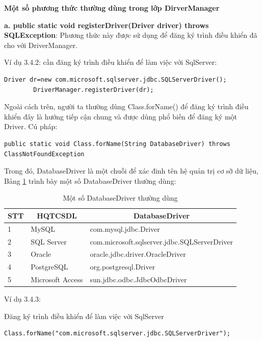 \textbf{Một số phương thức thường dùng trong lớp DirverManager}


 \textbf{a. public static void registerDriver(Driver driver) throws SQLException}: 
	Phương thức này được sử dụng để đăng ký trình điều khiển đã cho với DriverManager.
	
	Ví dụ 3.4.2: cần đăng ký trình điều khiển để làm việc với SqlServer:
		\lstset{language=Java}
	\begin{lstlisting}[escapechar=`]
		Driver dr=new com.microsoft.sqlserver.jdbc.SQLServerDriver();
		DriverManager.registerDriver(dr);
	\end{lstlisting}
	
Ngoài cách trên, người ta thường dùng Class.forName()  để đăng ký trình điều khiển đây là hướng tiếp cận chung và được dùng phổ biến để đăng ký một Driver. Cú pháp:
	\lstset{language=Java}

\begin{lstlisting}[escapechar=`]
public static void Class.forName(String DatabaseDriver) throws ClassNotFoundException
\end{lstlisting}
Trong đó, DatabaseDriver là một chuỗi để xác đinh tên hệ quản trị cơ sỡ dữ liệu, Bảng \ref{bang32} trình bày một số DatabaseDriver thường dùng:
\begin{center}
	\begin{longtable}{|m{1cm}|m{2cm}|m{8cm}|}
		\caption[Một số DatabaseDriver thường dùng]{Một số DatabaseDriver thường dùng}
		\label{bang32}
		\endfirsthead
		\endhead
		\hline
		\multicolumn{1}{|c|}{\textbf{STT}} &\multicolumn{1}{c|}{	\textbf{ HQTCSDL}}
		&\multicolumn{1}{c|}{	\textbf{DatabaseDriver}}\\ \hline
		1&	MySQL & com.mysql.jdbc.Driver \\ \hline
		2&SQL Server &	com.microsoft.sqlserver.jdbc.SQLServerDriver \\ \hline
		3&	Oracle &	oracle.jdbc.driver.OracleDriver\\ \hline 
		4&	PostgreSQL &	org.postgresql.Driver \\ \hline 
		5&	Microsoft Access
		 &	sun.jdbc.odbc.JdbcOdbcDriver
		\\ \hline 
	\end{longtable}
\end{center}
\vspace{-1cm}
Ví dụ 3.4.3: 

Đăng ký trình điều khiển để làm việc với SqlServer
	\lstset{language=Java}
	\begin{lstlisting}[escapechar=`]
Class.forName("com.microsoft.sqlserver.jdbc.SQLServerDriver");
	\end{lstlisting}

